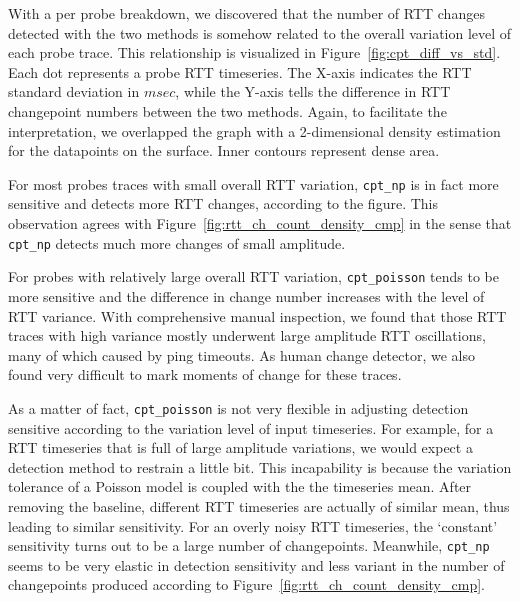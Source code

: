 With a per probe breakdown, we discovered that the number of RTT changes detected with the two methods is somehow related to the overall variation level of each probe trace.
This relationship is visualized in Figure~\ref{fig:cpt_diff_vs_std}.
Each dot represents a probe RTT timeseries. 
The X-axis indicates the RTT standard deviation in $msec$, while the Y-axis tells the difference in RTT changepoint numbers between the two methods.
Again, to facilitate the interpretation, we overlapped the graph with a 2-dimensional density estimation for the datapoints on the surface. Inner contours represent dense area.

For most probes traces with small overall RTT variation, \texttt{cpt\_np} is in fact more sensitive and detects more RTT changes, according to the figure.
This observation agrees with Figure~\ref{fig:rtt_ch_count_density_cmp} in the sense that \texttt{cpt\_np} detects much more changes of small amplitude.

For probes with relatively large overall RTT variation, \texttt{cpt\_poisson} tends to be more sensitive and the difference in change number increases with the level of RTT variance.
With comprehensive manual inspection, we found that those RTT traces with high variance mostly underwent large amplitude RTT oscillations, many of which caused by ping timeouts. 
As human change detector, we also found very difficult to mark moments of change for these traces.

As a matter of fact, \texttt{cpt\_poisson} is not very flexible in adjusting detection sensitive according to the variation level of input timeseries.
For example, for a RTT timeseries that is full of large amplitude variations, 
we would expect a detection method to restrain a little bit.
This incapability is because the variation tolerance of a Poisson model is coupled with the the timeseries mean.
After removing the baseline, different RTT timeseries are actually of similar mean, thus leading to similar sensitivity.
For an overly noisy RTT timeseries, the `constant' sensitivity turns out to be a large number of changepoints.
Meanwhile, \texttt{cpt\_np} seems to be very elastic in detection sensitivity and less variant in the number of changepoints produced according to Figure~\ref{fig:rtt_ch_count_density_cmp}.

